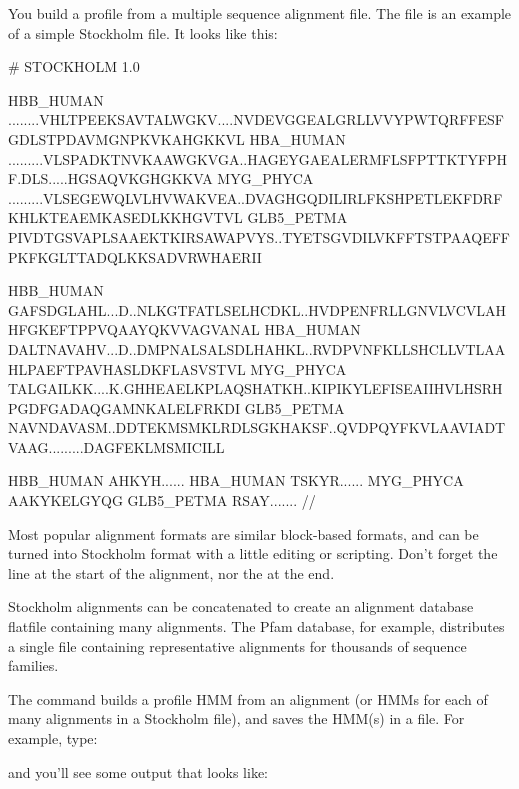 You build a profile from a multiple sequence alignment file.  The file
 is an example of a simple Stockholm
file. It looks like this:

\begin{samepage}
\begin{sreoutput}
# STOCKHOLM 1.0

HBB_HUMAN   ........VHLTPEEKSAVTALWGKV....NVDEVGGEALGRLLVVYPWTQRFFESFGDLSTPDAVMGNPKVKAHGKKVL
HBA_HUMAN   .........VLSPADKTNVKAAWGKVGA..HAGEYGAEALERMFLSFPTTKTYFPHF.DLS.....HGSAQVKGHGKKVA
MYG_PHYCA   .........VLSEGEWQLVLHVWAKVEA..DVAGHGQDILIRLFKSHPETLEKFDRFKHLKTEAEMKASEDLKKHGVTVL
GLB5_PETMA  PIVDTGSVAPLSAAEKTKIRSAWAPVYS..TYETSGVDILVKFFTSTPAAQEFFPKFKGLTTADQLKKSADVRWHAERII

HBB_HUMAN   GAFSDGLAHL...D..NLKGTFATLSELHCDKL..HVDPENFRLLGNVLVCVLAHHFGKEFTPPVQAAYQKVVAGVANAL
HBA_HUMAN   DALTNAVAHV...D..DMPNALSALSDLHAHKL..RVDPVNFKLLSHCLLVTLAAHLPAEFTPAVHASLDKFLASVSTVL
MYG_PHYCA   TALGAILKK....K.GHHEAELKPLAQSHATKH..KIPIKYLEFISEAIIHVLHSRHPGDFGADAQGAMNKALELFRKDI
GLB5_PETMA  NAVNDAVASM..DDTEKMSMKLRDLSGKHAKSF..QVDPQYFKVLAAVIADTVAAG.........DAGFEKLMSMICILL

HBB_HUMAN   AHKYH......
HBA_HUMAN   TSKYR......
MYG_PHYCA   AAKYKELGYQG
GLB5_PETMA  RSAY.......
//
\end{sreoutput}
\end{samepage}

Most popular alignment formats are similar block-based formats, and
can be turned into Stockholm format with a little editing or
scripting. Don't forget the  line at the start
of the alignment, nor the \prog{//} at the end. 

Stockholm alignments can be concatenated to create an alignment
database flatfile containing many alignments. The Pfam database, for
example, distributes a single file containing representative
alignments for thousands of sequence families.

The  command builds a profile HMM from an alignment (or
HMMs for each of many alignments in a Stockholm file), and saves the
HMM(s) in a file. For example, type:


and you'll see some output that looks like:

